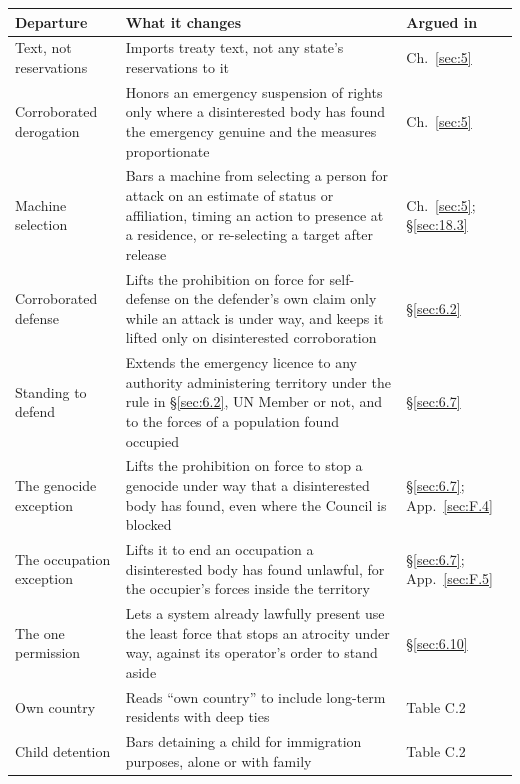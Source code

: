 \begingroup\small\renewcommand{\arraystretch}{1.12}
\begin{longtable}{@{}>{\raggedright\arraybackslash}p{}>{\raggedright\arraybackslash}p{}>{\raggedright\arraybackslash}p{}@{}}
\hline
\textbf{Departure} & \textbf{What it changes} & \textbf{Argued in} \\
\hline
\endhead
Text, not reservations & Imports treaty text, not any state's reservations to it & Ch.~\ref{sec:5} \\ \hline
Corroborated derogation & Honors an emergency suspension of rights only where a disinterested body has found the emergency genuine and the measures proportionate & Ch.~\ref{sec:5} \\ \hline
Machine selection & Bars a machine from selecting a person for attack on an estimate of status or affiliation, timing an action to presence at a residence, or re-selecting a target after release & Ch.~\ref{sec:5}; \S\ref{sec:18.3} \\ \hline
Corroborated defense & Lifts the prohibition on force for self-defense on the defender's own claim only while an attack is under way, and keeps it lifted only on disinterested corroboration & \S\ref{sec:6.2} \\ \hline
Standing to defend & Extends the emergency licence to any authority administering territory under the rule in \S\ref{sec:6.2}, UN Member or not, and to the forces of a population found occupied & \S\ref{sec:6.7} \\ \hline
The genocide exception & Lifts the prohibition on force to stop a genocide under way that a disinterested body has found, even where the Council is blocked & \S\ref{sec:6.7}; App.~\ref{sec:F.4} \\ \hline
The occupation exception & Lifts it to end an occupation a disinterested body has found unlawful, for the occupier's forces inside the territory & \S\ref{sec:6.7}; App.~\ref{sec:F.5} \\ \hline
The one permission & Lets a system already lawfully present use the least force that stops an atrocity under way, against its operator's order to stand aside & \S\ref{sec:6.10} \\ \hline
Own country & Reads “own country” to include long-term residents with deep ties & Table C.2 \\ \hline
Child detention & Bars detaining a child for immigration purposes, alone or with family & Table C.2 \\ \hline
\end{longtable}
\endgroup

